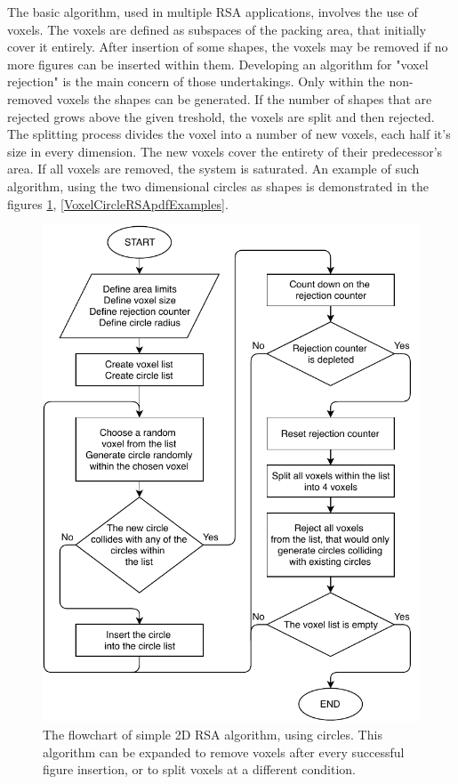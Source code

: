 \documentclass[12pt, oneside]{report}
\begin{document}
The basic algorithm, used in multiple RSA applications, involves the use of voxels. The voxels are defined as subspaces of the packing area, that initially cover it entirely. After insertion of some shapes, the voxels may be removed if no more figures can be inserted within them. Developing an algorithm for "voxel rejection" is the main concern of those undertakings. Only within the non-removed voxels the shapes can be generated. If the number of shapes that are rejected grows above the given treshold, the voxels are split and then rejected. The splitting process divides the voxel into a number of new voxels, each half it's size in every dimension. The new voxels cover the entirety of their predecessor's area. If all voxels are removed, the system is saturated. An example of such algorithm, using the two dimensional circles as shapes is demonstrated in the figures \ref{VoxelCircleRSApdff}, \ref{VoxelCircleRSApdfExamples}.

\begin{figure}[H]

  \centering
	\includegraphics{Images/2dCircleRSA/VoxelCircleRSA.pdf}
  \caption{The flowchart of simple 2D RSA algorithm, using circles. \newline
		This algorithm can be expanded to remove voxels after every successful figure insertion, or to split voxels at a different condition.}

	\label{VoxelCircleRSApdff}
\end{figure}
\end{document}
